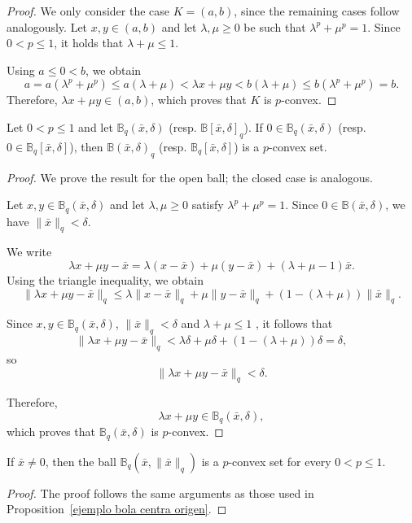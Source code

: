 \documentclass[10pt]{article}
\begin{document}
\begin{proof}
We only consider the case $K=(a,b)$, since the remaining cases follow analogously.
Let $x,y\in(a,b)$ and let $\lambda,\mu\ge0$ be such that $\lambda^p+\mu^p=1$.
Since $0<p\le1$, it holds that $\lambda+\mu\le1$.

Using $a\le0<b$, we obtain
\[
a = a(\lambda^p+\mu^p) \le a(\lambda+\mu)
   < \lambda x + \mu y
   < b(\lambda+\mu) \le b(\lambda^p+\mu^p) = b.
\]
Therefore, $\lambda x+\mu y\in(a,b)$, which proves that $K$ is $p$-convex.
\end{proof}
\begin{proposition}
Let $0<p\le 1$ and let $\mathbb{B}_{q}(\bar{x},\delta)$ (resp. $\mathbb{B}[\bar{x},\delta]_{q}$).  
If $0\in \mathbb{B}_{q}(\bar{x},\delta)$ (resp. $0\in \mathbb{B}_{q}[\bar{x},\delta]$), then $\mathbb{B}(\bar{x},\delta)_{q}$ (resp. $\mathbb{B}_{q}[\bar{x},\delta]$) is a $p$-convex set.
\label{ejemplo bola centra origen}
\end{proposition}
\begin{proof}
We prove the result for the open ball; the closed case is analogous.

Let $x,y \in \mathbb{B}_{q}(\bar{x},\delta)$ and let $\lambda,\mu \ge 0$ satisfy $\lambda^p+\mu^p=1$.  
Since $0\in \mathbb{B}(\bar{x},\delta)$, we have $\|\bar{x}\|_q < \delta$.

We write
\[
\lambda x + \mu y - \bar{x}
= \lambda(x-\bar{x}) + \mu(y-\bar{x}) + (\lambda+\mu-1)\bar{x}.
\]
Using the triangle inequality, we obtain
\[
\|\lambda x + \mu y - \bar{x}\|_q
\le \lambda\|x-\bar{x}\|_q + \mu\|y-\bar{x}\|_q + (1-(\lambda+\mu))\|\bar{x}\|_q.
\]

Since $x,y \in \mathbb{B}_{q}(\bar{x},\delta)$, $\|\bar{x}\|_q<\delta$ and $\lambda+\mu \leq 1$ , it follows that
\[
\|\lambda x + \mu y - \bar{x}\|_q
< \lambda\delta + \mu\delta + (1-(\lambda+\mu))\delta
= \delta
,\]
 so
\[
\|\lambda x + \mu y - \bar{x}\|_q < \delta.
\]

Therefore,
\[
\lambda x + \mu y \in \mathbb{B}_{q}(\bar{x},\delta),
\]
which proves that $\mathbb{B}_{q}(\bar{x},\delta)$ is $p$-convex.
\end{proof}

\begin{proposition}
If $\bar{x} \neq 0$, then the ball $\mathbb{B}_{q}(\bar{x}, \|\bar{x}\|_{q})$ is a $p$-convex set for every $0 < p \leq 1$.
\label{ejemplo bola no origen}
\end{proposition}
\begin{proof}
The proof follows the same arguments as those used in Proposition~\ref{ejemplo bola centra origen}.
\end{proof}
\end{document}
